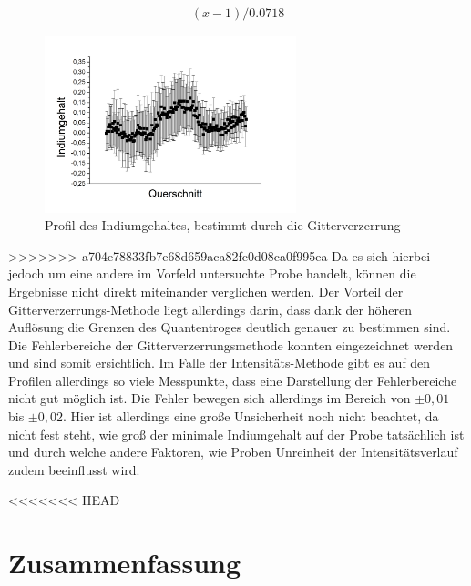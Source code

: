\documentclass[a4paper,11pt,DIV=11]{scrartcl}
\begin{document}
\begin{align*}
	(x-1) / 0.0718
\end{align*}

\begin{figure}[H]\centering
	\includegraphics[width=0.65\textwidth]{Versuchsdaten/13/Graph01.png}
\caption{Profil des Indiumgehaltes, bestimmt durch die Gitterverzerrung}
\label{hochindium}
\end{figure}

>>>>>>> a704e78833fb7e68d659aca82fc0d08ca0f995ea
Da es sich hierbei jedoch um eine andere im Vorfeld untersuchte Probe handelt, können die Ergebnisse nicht direkt miteinander verglichen werden. Der Vorteil der Gitterverzerrungs-Methode liegt allerdings darin, dass dank der höheren Auflösung die Grenzen des Quantentroges deutlich genauer zu bestimmen sind. \\
Die Fehlerbereiche der Gitterverzerrungsmethode konnten eingezeichnet werden und sind somit ersichtlich. Im Falle der Intensitäts-Methode gibt es auf den Profilen allerdings so viele Messpunkte, dass eine Darstellung der Fehlerbereiche nicht gut möglich ist. Die Fehler bewegen sich allerdings im Bereich von $\pm0,01$ bis $\pm0,02$. Hier ist allerdings eine große Unsicherheit noch nicht beachtet, da nicht fest steht, wie groß der minimale Indiumgehalt auf der Probe tatsächlich ist und durch welche andere Faktoren, wie Proben Unreinheit der Intensitätsverlauf zudem beeinflusst wird.


<<<<<<< HEAD
\section{Zusammenfassung}
\end{document}
